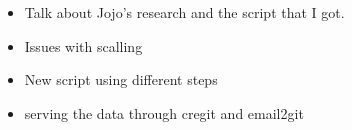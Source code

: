 \label{sec:Theme2}


\begin{itemize}
	\item Talk about Jojo's research and the script that I got.
	\item Issues with scalling
	\item New script using different steps
	\item serving the data through cregit and email2git
\end{itemize}